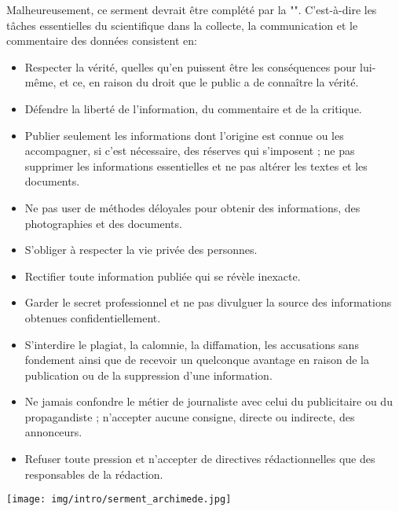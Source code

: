 Malheureusement, ce serment devrait être complété par la "". C'est-à-dire les tâches essentielles du scientifique dans la collecte, la communication et le commentaire des données consistent en:
\begin{itemize}
	\item Respecter la vérité, quelles qu’en puissent être les conséquences pour lui-même, et ce, en raison du droit que le public a de connaître la vérité.

	\item Défendre la liberté de l’information, du commentaire et de la critique.

	\item Publier seulement les informations dont l’origine est connue ou les accompagner, si c’est nécessaire, des réserves qui s’imposent ; ne pas supprimer les informations essentielles et ne pas altérer les textes et les documents.

	\item Ne pas user de méthodes déloyales pour obtenir des informations, des photographies et des documents.

	\item S'obliger à respecter la vie privée des personnes.

	\item Rectifier toute information publiée qui se révèle inexacte.

	\item Garder le secret professionnel et ne pas divulguer la source des informations obtenues confidentiellement.

	\item S'interdire le plagiat, la calomnie, la diffamation, les accusations sans fondement ainsi que de recevoir un quelconque avantage en raison de la publication ou de la suppression d'une information.

	\item Ne jamais confondre le métier de journaliste avec celui du publicitaire ou du propagandiste ; n’accepter aucune consigne, directe ou indirecte, des annonceurs.

	\item Refuser toute pression et n’accepter de directives rédactionnelles que des responsables de la rédaction.
\end{itemize}

	\begin{center}
		\texttt{[image: img/intro/serment\_archimede.jpg]}
	\end{center}

